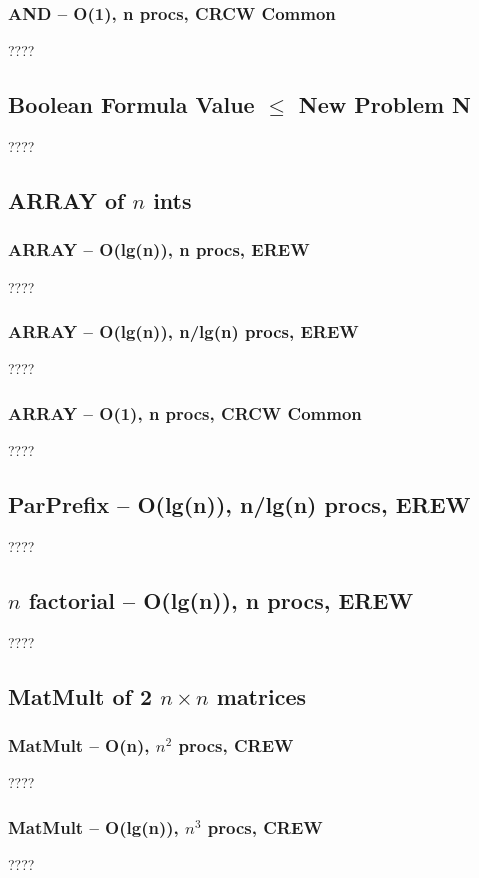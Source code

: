 \documentclass[12pt]{article}
\providecommand{\reducible}[2]{
  \textbf{#1} $\leq$ \textbf{#2}
}
\begin{document}
\subsubsection{AND -- O(1), n procs, CRCW Common}
????


\subsection{\reducible{Boolean Formula Value}{New Problem N}}
????


\subsection{ARRAY of $n$ ints}
\subsubsection{ARRAY -- O(lg(n)), n procs, EREW}
????
\subsubsection{ARRAY -- O(lg(n)), n/lg(n) procs, EREW}
????
\subsubsection{ARRAY -- O(1), n procs, CRCW Common}
????


\subsection{ParPrefix -- O(lg(n)), n/lg(n) procs, EREW}
????


\subsection{$n$ factorial -- O(lg(n)), n procs, EREW}
????



\subsection{MatMult of 2 $n\times n$ matrices}
\subsubsection{MatMult -- O(n), $n^2$ procs, CREW}
????
\subsubsection{MatMult -- O(lg(n)), $n^3$ procs, CREW}
????
\end{document}
